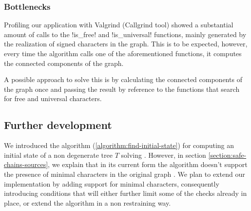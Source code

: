 \subsubsection{Bottlenecks}\label{section:bottlenecks}

Profiling our application with Valgrind (Callgrind tool) showed a substantial amount of calls to the !is_free! and !is_universal! functions, mainly generated by the realization of signed characters in the graph.
This is to be expected, however, every time the algorithm calls one of the aforementioned functions, it computes the connected components of the graph.

A possible approach to solve this is by calculating the connected components of the graph once and passing the result by reference to the functions that search for free and universal characters.

\subsection{Further development}\label{section:further-dev}

We introduced the algorithm (\ref{algorithm:find-initial-state}) for computing an initial state of a non degenerate tree $T$ solving \grb{}.
However, in section \ref{section:safe-chains-sources}, we explain that in its current form the algorithm doesn't support the presence of minimal characters in the original graph \grb{}.
We plan to extend our implementation by adding support for minimal characters, consequently introducing conditions that will either further limit some of the checks already in place, or extend the algorithm in a non restraining way.
